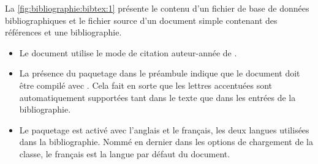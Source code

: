 \begin{exemple}
  La \autoref{fig:bibliographie:bibtex:1} présente le contenu d'un
  fichier de base de données bibliographiques et le fichier source
  d'un document simple contenant des références et une bibliographie.

  \begin{itemize}
  \item Le document utilise le mode de citation auteur-année de
    .
  \item La présence du paquetage  dans le préambule
    indique que le document doit être compilé avec {\XeLaTeX}. Cela
    fait en sorte que les lettres accentuées sont automatiquement
    supportées tant dans le texte que dans les entrées de la
    bibliographie.
  \item Le paquetage  est activé avec l'anglais et le
    français, les deux langues utilisées dans la bibliographie. Nommé
    en dernier dans les options de chargement de la classe, le
    français est la langue par défaut du document.
  \end{itemize}


\end{exemple}
